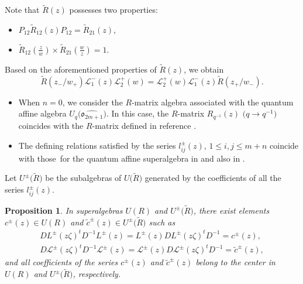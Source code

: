 \documentclass[pdftex]{sigma}
\numberwithin{equation}{section}
\newtheorem{Proposition}[Theorem]{Proposition}
 { \theoremstyle{definition}
\newtheorem{Definition}[Theorem]{Definition}
\newtheorem{Note}[Theorem]{Note}
\newtheorem{Example}[Theorem]{Example}
\newtheorem{Remark}[Theorem]{Remark} }
\begin{document}
Note that $\widetilde{R}(z)$ possesses two properties:
\begin{itemize}\itemsep=0pt
 \item[(1)] $P_{12}\widetilde{R}_{12}(z)P_{12}=\widetilde{R}_{21}(z)$,
 \item[(2)] $\widetilde{R}_{12}\left(\frac{z}{w}\right)\times
 \widetilde{R}_{21}\left(\frac{w}{z}\right)=1$.
\end{itemize}
Based on the aforementioned properties of $\widetilde{R}(z)$, we obtain
\[%
 \widetilde{R}(z_-/w_+)\mathcal{L}_1^{-}(z)\mathcal{L}_2^{+}(w)=\mathcal{L}_2^{+}(w)\mathcal{L}_1^{-}(z)\widetilde{R}(z_+/w_-).
\]
\begin{Remark}\label{RM2}\quad
\begin{itemize}\itemsep=0pt
 \item[(1)] When $n=0$, we consider the $R$-matrix algebra associated with the quantum affine algebra $U_q\bigl(\widehat{\mathfrak{o}_{2m+1}}\bigr)$.
 In this case, the $R$-matrix $R_{q^{-1}}(z)$ $\bigl(q\rightarrow q^{-1}\bigr)$ coincides with the $R$-matrix defined in reference \cite{MJB2}.
 \item[(2)] The defining relations satisfied by the series $l_{ij}^{\pm}(z)$, $1\leq i,j \leq m+n$ coincide with those~for the quantum affine superalgebra  in \cite{HBKD} and also in \cite{YZC}.
\end{itemize}
\end{Remark}



Let $U^{\pm}\bigl(\widetilde{R}\bigr)$ be the subalgebras of $U\bigl(\widetilde{R}\bigr)$ generated by the coefficients of all the series $l_{ij}^{\pm}(z)$.
\begin{Proposition}\label{Apr2}
In superalgebras $U(R)$ and $U^{\pm}\bigl(\widetilde{R}\bigr)$, there exist elements $c^{\pm}(z)\in U(R)$ and $\widetilde{c}^{\pm}(z)\in U^{\pm}\bigl(\widetilde{R}\bigr)$ such as
\begin{gather}%
 DL^{\pm}(z\zeta)^tD^{-1}L^{\pm}(z)=L^{\pm}(z)DL^{\pm}(z\zeta)^tD^{-1}=c^{\pm}(z),\nonumber\\
 D\mathcal{L}^{\pm}(z\zeta)^tD^{-1}\mathcal{L}^{\pm}(z)=\mathcal{L}^{\pm}(z)D\mathcal{L}^{\pm}(z\zeta)^tD^{-1}=\widetilde{c}^{\pm}(z), \label{d9}
\end{gather}
and all coefficients of the series $c^{\pm}(z)$ and $\widetilde{c}^{\pm}(z)$ belong to the center in $U(R)$ and $U^{\pm}\bigl(\widetilde{R}\bigr)$, respectively.
\end{Proposition}
\end{document}
